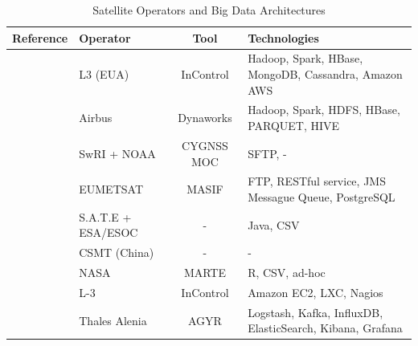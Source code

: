 \begin{table}[htbp]
  \begin{center}
    \caption{Satellite Operators and Big Data Architectures}\label{table:bigdataoperators}
    \begin{tabular}{|C{11em}|C{6em}|c|C{10em}|}
      \hline
      \bfseries Reference                           & \bfseries Operator & \bfseries Tool & \bfseries Technologies                                                                \\
      \hline
      \cite{adamskiDataAnalyticsLarge2016}           & L3 (EUA)           & InControl            & Hadoop, Spark, HBase, MongoDB, Cassandra, Amazon AWS                                 \\
      \hline
      \cite{boussoufBigDataBased2018}                & Airbus             & Dynaworks            & Hadoop, Spark, HDFS, HBase, PARQUET, HIVE                                            \\
      \hline
      \cite{dischnerCYGNSSMOCMeeting2016}            & SwRI + NOAA        & CYGNSS MOC           & SFTP, -                                                                              \\
      \hline
      \cite{edwardsDealingBigData2018}               & EUMETSAT           & MASIF                & FTP, RESTful service, JMS Messague Queue, PostgreSQL                                 \\
      \hline
      \cite{evansDataMiningDrastically2016}          & S.A.T.E + ESA/ESOC & -                    & Java, CSV                                                                            \\
      \hline
      \cite{fenManagementOperationCommunication2016} & CSMT (China)       & -                    & - \\
      \hline
      \cite{fernandezTelemetryAnomalyDetection2017}  & NASA               & MARTE                & R, CSV, ad-hoc                                                                       \\
      \hline
      \cite{gillesFlyingLargeConstellations2016}     & L-3                & InControl            & Amazon EC2, LXC, Nagios                                                              \\
      \hline
      \cite{hennionBigdataSatelliteYearly2018}       & Thales Alenia      & AGYR                 & Logstash, Kafka, InfluxDB, ElasticSearch, Kibana, Grafana                            \\

\end{tabular}
\end{center}
\end{table}
